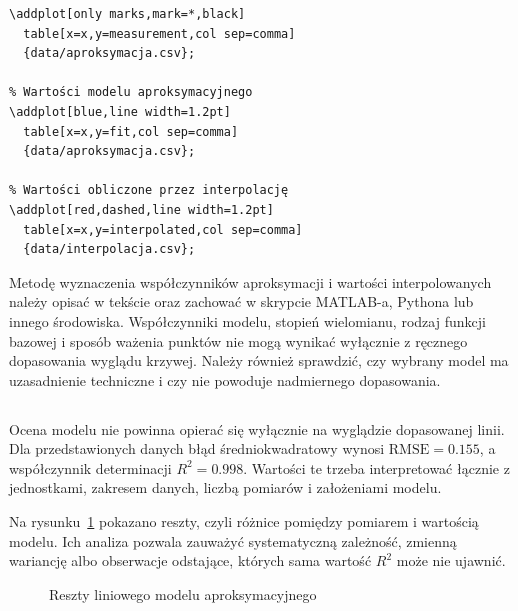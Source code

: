 \begin{lstlisting}[caption={\ploren{Aproksymacja i interpolacja z danych CSV}{Approximation and interpolation from CSV data}}]
% Punkty pomiarowe
\addplot[only marks,mark=*,black]
  table[x=x,y=measurement,col sep=comma]
  {data/aproksymacja.csv};

% Wartości modelu aproksymacyjnego
\addplot[blue,line width=1.2pt]
  table[x=x,y=fit,col sep=comma]
  {data/aproksymacja.csv};

% Wartości obliczone przez interpolację
\addplot[red,dashed,line width=1.2pt]
  table[x=x,y=interpolated,col sep=comma]
  {data/interpolacja.csv};
\end{lstlisting}

Metodę wyznaczenia współczynników aproksymacji i wartości interpolowanych należy opisać w tekście oraz zachować w skrypcie MATLAB-a, Pythona lub innego środowiska. Współczynniki modelu, stopień wielomianu, rodzaj funkcji bazowej i sposób ważenia punktów nie mogą wynikać wyłącznie z ręcznego dopasowania wyglądu krzywej. Należy również sprawdzić, czy wybrany model ma uzasadnienie techniczne i czy nie powoduje nadmiernego dopasowania.

\subsection{}

Ocena modelu nie powinna opierać się wyłącznie na wyglądzie dopasowanej linii. Dla przedstawionych danych błąd średniokwadratowy wynosi $\mathrm{RMSE}=\num{0.155}$, a współczynnik determinacji $R^2=\num{0.998}$. Wartości te trzeba interpretować łącznie z jednostkami, zakresem danych, liczbą pomiarów i założeniami modelu.

Na rysunku~\ref{fig:reszty-aproksymacji} pokazano reszty, czyli różnice pomiędzy pomiarem i wartością modelu. Ich analiza pozwala zauważyć systematyczną zależność, zmienną wariancję albo obserwacje odstające, których sama wartość \(R^2\) może nie ujawnić.

\begin{figure}[htbp]
  \centering
  \caption{Reszty liniowego modelu aproksymacyjnego}
  \label{fig:reszty-aproksymacji}
\end{figure}

